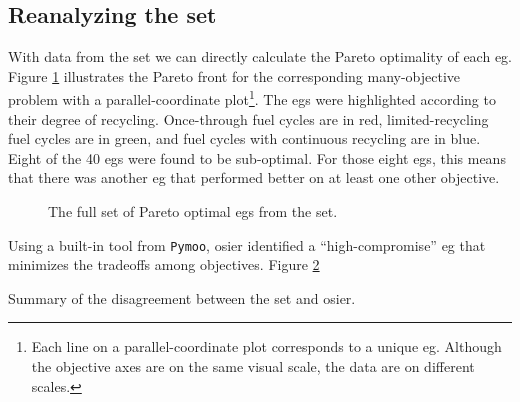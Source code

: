\subsection{Reanalyzing the \gls{set}}

With data from the \gls{set} we can directly calculate the Pareto optimality of
each \gls{eg}. Figure \ref{fig:full-set-plot} illustrates the Pareto front 
for the corresponding many-objective problem with a parallel-coordinate plot\footnote{Each line on
a parallel-coordinate plot corresponds to a unique \gls{eg}. Although the objective
axes are on the same visual scale, the data are on different scales.}.
The \glspl{eg} were highlighted according to their degree of recycling. Once-through
fuel cycles are in red, limited-recycling fuel cycles are in green, and fuel cycles
with continuous recycling are in blue.
Eight of the 40 \glspl{eg} were found to be sub-optimal. For those eight \glspl{eg}, 
this means that there was another \gls{eg} that performed better on at least one
other objective.

\begin{figure}[ht!]
    \begin{center}
        \resizebox{\columnwidth}{!}{}
        \caption{The full set of Pareto optimal \glspl{eg} from 
        the \gls{set}.}
        \label{fig:full-set-plot}
    \end{center}
\end{figure}


Using a built-in tool from \texttt{Pymoo}, \gls{osier} identified a ``high-compromise'' 
\gls{eg} that minimizes the tradeoffs among objectives. Figure \ref{fig:knee-solution}

\begin{figure}[ht!]
    \begin{center}
        \resizebox{\columnwidth}{!}{}
        \caption{}
        \label{fig:knee-solution}
    \end{center}
\end{figure}

\begin{table}[ht!]
    \centering
    \caption{Summary of the disagreement between the \gls{set} and \gls{osier}.}
    \label{tab:summary-subset}
    \resizebox{\columnwidth}{!}{}
\end{table}

